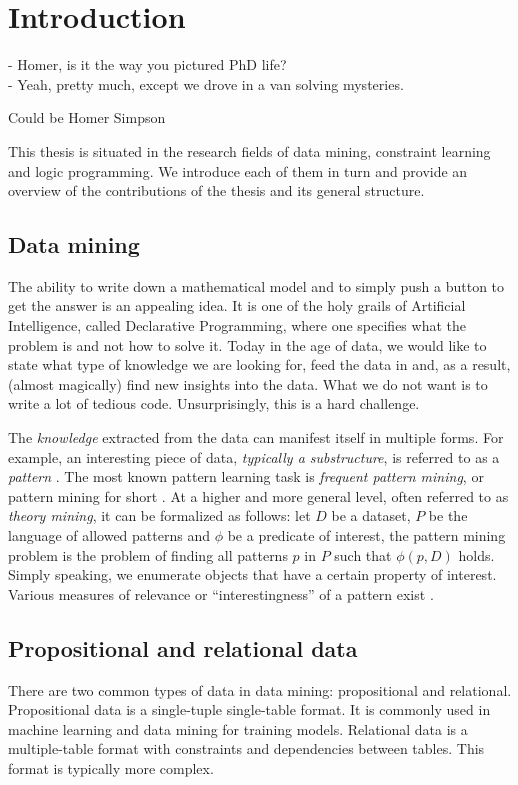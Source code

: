 \chapter{Introduction}\label{ch:introduction}
\epigraph{
- Homer, is it the way you pictured PhD life?\\
- Yeah, pretty much, except we drove in a van solving mysteries.
}{Could be Homer Simpson}

\begin{addmargin}[5em]{5em}
This thesis is situated in the research fields of data mining, constraint learning
and logic programming. We introduce each of them in turn and provide an overview of the
contributions of the thesis and
its general structure.
\end{addmargin}

\section{Data mining}
The ability to write down a mathematical model and to simply push a button to get the
answer is an appealing idea. It is one of the holy grails of
Artificial Intelligence, called Declarative Programming, where one
specifies what the problem is and not how to solve it. Today in the age of data, we would like
to state what type of knowledge we are looking for, feed the data in and, as a result,
(almost magically) find new insights into the data. What we do not want is to write
a lot of tedious code. Unsurprisingly, this is a hard challenge. 


The \textit{knowledge} extracted from the data can manifest itself in
multiple forms. For example, an interesting piece of data,
\textit{typically a substructure}, is referred to as a \textit{pattern} \parencite{han_book}. 
The most known pattern learning task is 
\textit{frequent pattern mining}, or pattern mining for short
\parencite{survey_han}. \pubrev
At a higher and more general level, often referred to as \textit{theory
mining}, \pubrevend it can be formalized as follows: 
let $D$ be a dataset, $P$ be the language of allowed patterns and
$\phi$ be a predicate of
interest, the pattern mining problem is the problem of finding
all patterns $p$ in $P$ such that $\phi(p,D)$ holds.
Simply speaking, we enumerate objects that have a certain property of
interest.
Various measures of relevance or ``interestingness'' of a pattern exist \parencite{tias_topk}.


\section{Propositional and relational data}
There are two common types of data in data mining: propositional and
relational. Propositional data is a single-tuple single-table format.
It is commonly used in machine learning and data mining for training
models. Relational data is a multiple-table format with
constraints and dependencies between tables. This format is typically
more complex.

